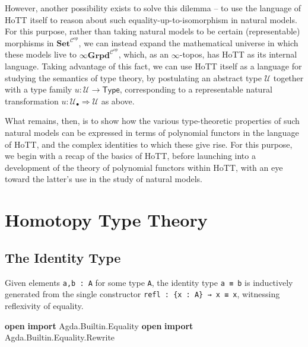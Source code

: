 \documentclass[
  11pt,
  oneside,
  article]{memoir}
\newenvironment{Shaded}{}{}
\newcommand{\KeywordTok}[1]{\textcolor[rgb]{0.00,0.44,0.13}{\textbf{#1}}}
\newcommand{\NormalTok}[1]{#1}
\newcommand{\OtherTok}[1]{\textcolor[rgb]{0.00,0.44,0.13}{#1}}
\theoremstyle{definition}
\theoremstyle{plain}
\newcommand{\0}{\textsf{0}}
\newcommand{\1}{\tn{\textsf{1}}}
\begin{document}
However, another possibility exists to solve this dilemma -- to use the
language of HoTT itself to reason about such equality-up-to-isomorphism
in natural models. For this purpose, rather than taking natural models
to be certain (representable) morphisms in
\(\mathbf{Set}^{\mathcal{C}^{op}}\), we can instead expand the
mathematical universe in which these models live to
\(\mathbf{\infty Grpd}^{\mathcal{C}^{op}}\), which, as an
\(\infty\)-topos, has HoTT as its internal language. Taking advantage of
this fact, we can use HoTT itself as a language for studying the
semantics of type theory, by postulating an abstract type
\(\mathcal{U}\) together with a type family
\(u : \mathcal{U} \to \mathsf{Type}\), corresponding to a representable
natural transformation
\(u : \mathcal{U}_\bullet \Rightarrow \mathcal{U}\) as above.

What remains, then, is to show how the various type-theoretic properties
of such natural models can be expressed in terms of polynomial functors
in the language of HoTT, and the complex identities to which these give
rise. For this purpose, we begin with a recap of the basics of HoTT,
before launching into a development of the theory of polynomial functors
within HoTT, with an eye toward the latter's use in the study of natural
models.

\section{Homotopy Type Theory}\label{homotopy-type-theory}

\subsection{The Identity Type}\label{the-identity-type}

Given elements \texttt{a,b\ :\ A} for some type \texttt{A}, the identity
type \texttt{a\ ≡\ b} is inductively generated from the single
constructor \texttt{refl\ :\ \{x\ :\ A\}\ →\ x\ ≡\ x}, witnessing
reflexivity of equality.

\begin{Shaded}
\begin{Highlighting}[]
\KeywordTok{open} \KeywordTok{import}\NormalTok{ Agda}\OtherTok{.}\NormalTok{Builtin}\OtherTok{.}\NormalTok{Equality}
\KeywordTok{open} \KeywordTok{import}\NormalTok{ Agda}\OtherTok{.}\NormalTok{Builtin}\OtherTok{.}\NormalTok{Equality}\OtherTok{.}\NormalTok{Rewrite}
\end{Highlighting}
\end{Shaded}
\end{document}
